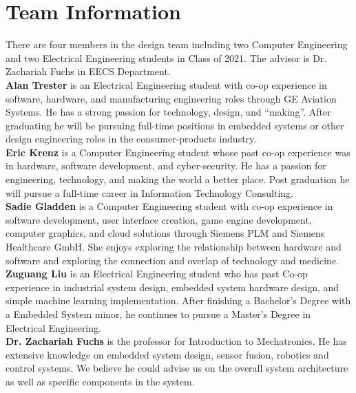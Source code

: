 \documentclass{report}
\begin{document}
\chapter{Team Information}

There are four members in the design team including two Computer Engineering and two Electrical Engineering students in Class of 2021. The advisor is Dr. Zachariah Fuchs in EECS Department.\\

\textbf{Alan Trester} is an Electrical Engineering student with co-op experience in software, hardware, and manufacturing engineering roles through GE Aviation Systems. He has a strong passion for technology, design, and ``making''. After graduating he will be pursuing full-time positions in embedded systems or other design engineering roles in the consumer-products industry.\\

\textbf{Eric Krenz} is a Computer Engineering student whose past co-op experience was in hardware, software development, and cyber-security. He has a passion for engineering, technology, and making the world a better place. Post graduation he will pursue a full-time career in Information Technology Consulting. \\

\textbf{Sadie Gladden } is a Computer Engineering student with co-op experience in software development, user interface creation, game engine development, computer graphics, and cloud solutions through Siemens PLM and Siemens Healthcare GmbH. She enjoys exploring the relationship between hardware and software and exploring the connection and overlap of technology and medicine. \\

\textbf{Zuguang Liu} is an Electrical Engineering student who has past Co-op experience in industrial system design, embedded system hardware design, and simple machine learning implementation. After finishing a Bachelor's Degree with a Embedded System minor, he continues to pursue a Master's Degree in Electrical Engineering. \\

\textbf{Dr. Zachariah Fuchs} is the professor for Introduction to Mechatronics. He has extensive knowledge on embedded system design, sensor fusion, robotics and control systems. We believe he could advise us on the overall system architecture as well as specific components in the system. \\
\end{document}
